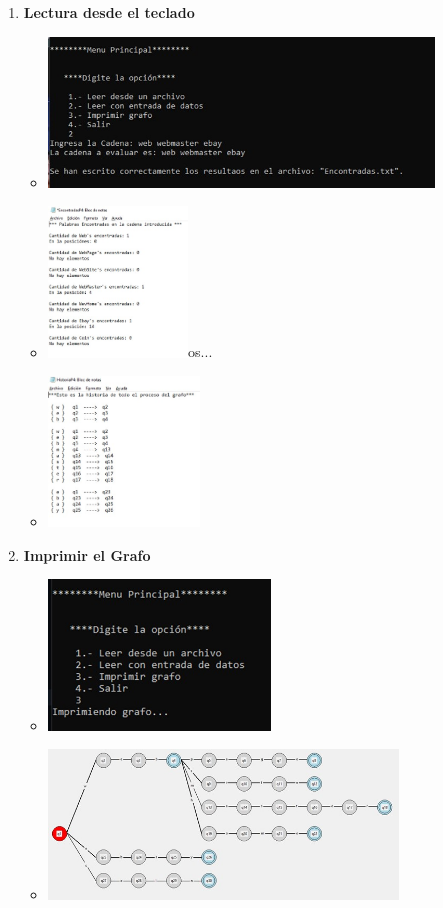 \documentclass{article}
\begin{document}
\begin{enumerate}
\begin{itemize}
		\end{itemize}				
		\item \textbf{Lectura desde el teclado}
		\begin{itemize}
			\item \includegraphics[height = 4cm]{LT1.jpg}
			\item \includegraphics[height = 4cm]{LT4.jpg}os...
			\item \includegraphics[height = 4cm]{LT3.jpg}
		\end{itemize}
		\item \textbf{Imprimir el Grafo}
		\begin{itemize}
			\item \includegraphics[height = 4cm]{IG1.jpg}
			\item \includegraphics[height = 4cm]{IG2.jpg}
		\end{itemize}
		
	\end{enumerate}
\end{document}

